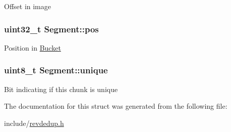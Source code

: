 \-Offset in image \hypertarget{structSegment_afcfb83f8948563d50c22c80577ff765d}{
\subsubsection[{pos}]{\setlength{\rightskip}{0pt plus 5cm}uint32\-\_\-t {\bf \-Segment\-::pos}}}\label{structSegment_afcfb83f8948563d50c22c80577ff765d}
\-Position in \hyperlink{structBucket}{\-Bucket} \hypertarget{structSegment_a1fcdfe7f7de73dbcc6078302e6e932a3}{
\subsubsection[{unique}]{\setlength{\rightskip}{0pt plus 5cm}uint8\-\_\-t {\bf \-Segment\-::unique}}}\label{structSegment_a1fcdfe7f7de73dbcc6078302e6e932a3}
\-Bit indicating if this chunk is unique 

\-The documentation for this struct was generated from the following file\-:\begin{DoxyCompactItemize}
\item 
include/\hyperlink{revdedup_8h}{revdedup.\-h}\end{DoxyCompactItemize}
